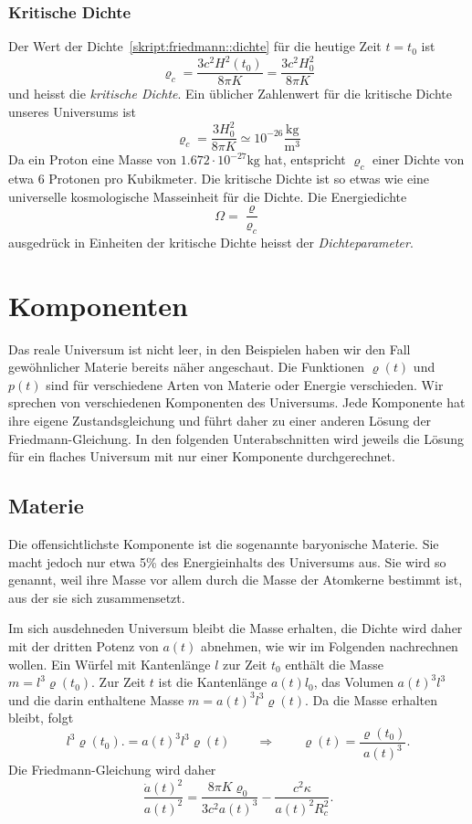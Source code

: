\subsubsection{Kritische Dichte}
Der Wert der Dichte~\eqref{skript:friedmann::dichte}
für die heutige Zeit $t=t_0$ ist
\[
\varrho_c = \frac{3c^2H^2(t_0)}{8\pi K}=\frac{3c^2H_0^2}{8\pi K}
\]
und heisst die {\em kritische Dichte}.
Ein üblicher Zahlenwert für die kritische Dichte unseres Universums ist
\[
\varrho_c = \frac{3H_0^2}{8\pi K}\simeq 10^{-26}\frac{\text{kg}}{\text{m}^3}
\]
Da ein Proton eine Masse von $1.672\cdot 10^{-27}\text{kg}$ hat, entspricht
$\varrho_c$ einer Dichte von etwa $6$ Protonen pro Kubikmeter.
Die kritische Dichte ist so etwas wie eine universelle kosmologische
Masseinheit für die Dichte.
Die Energiedichte
\[
\Omega=\frac{\varrho}{\varrho_c}
\]
ausgedrück in Einheiten der kritische Dichte heisst
der {\em Dichteparameter}.

\section{Komponenten}
Das reale Universum ist nicht leer, in den Beispielen haben wir den
Fall gewöhnlicher Materie bereits näher angeschaut.
Die Funktionen $\varrho(t)$ und $p(t)$ sind für verschiedene
Arten von Materie oder Energie verschieden.
Wir sprechen von verschiedenen Komponenten des Universums.
Jede Komponente hat ihre eigene Zustandsgleichung und führt
daher zu einer anderen Lösung der Friedmann-Gleichung.
In den folgenden Unterabschnitten wird jeweils die Lösung für
ein flaches Universum mit nur einer Komponente durchgerechnet.

\subsection{Materie}
Die offensichtlichste Komponente ist die sogenannte baryonische Materie.
Sie macht jedoch nur etwa 5\% des Energieinhalts des Universums aus.
Sie wird so genannt, weil ihre Masse vor allem durch die Masse der Atomkerne
bestimmt ist, aus der sie sich zusammensetzt.

Im sich ausdehneden Universum bleibt die Masse erhalten, die Dichte wird
daher mit der dritten Potenz von $a(t)$ abnehmen, wie wir im Folgenden
nachrechnen wollen.
Ein Würfel mit Kantenlänge $l$ zur Zeit $t_0$ enthält die Masse
$m=l^3 \varrho(t_0)$.
Zur Zeit $t$ ist die Kantenlänge $a(t)l_0$, das Volumen $a(t)^3l^3$
und die darin enthaltene Masse $m=a(t)^3l^3\varrho(t)$.
Da die Masse erhalten bleibt, folgt
\[
l^3 \varrho(t_0).
=
a(t)^3l^3\varrho(t)
\qquad\Rightarrow\qquad
\varrho(t)=\frac{\varrho(t_0)}{a(t)^3}.
\]
Die Friedmann-Gleichung wird daher
\begin{equation}
\frac{\dot a(t)^2}{a(t)^2}
=
\frac{8\pi K\varrho_0}{3c^2a(t)^3}-\frac{c^2\kappa}{a(t)^2R_c^2}.
\end{equation}

